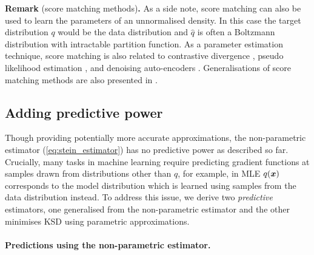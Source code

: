 \vspace{1em}
\begin{tcolorbox}
\textbf{Remark} (score matching methods)\textbf{.}
As a side note, score matching can also be used to learn the parameters of an unnormalised density. In this case the target distribution $q$ would be the data distribution and $\hat{q}$ is often a Boltzmann distribution with intractable partition function. As a parameter estimation technique, score matching is also related to contrastive divergence \citep{hinton:cd2002}, pseudo likelihood estimation \citep{hyvarinen:pseudolikelihood2006}, and denoising auto-encoders \citep{vincent:denoising2011}. Generalisations of score matching methods are also presented in \citep{lyu:score2009, marlin:rbm2010}.
\end{tcolorbox}

\subsection{Adding predictive power}
\label{sec:predictive_estimator}
Though providing potentially more accurate approximations, the non-parametric estimator (\ref{eq:stein_estimator}) has no predictive power as described so far. Crucially, many tasks in machine learning require predicting gradient functions at samples drawn from distributions other than $q$, for example, in MLE $q(\bm{x})$ corresponds to the model distribution which is learned using samples from the data distribution instead. To address this issue, we derive two \emph{predictive} estimators, one generalised from the non-parametric estimator and the other minimises KSD using parametric approximations.

\paragraph{Predictions using the non-parametric estimator.}

